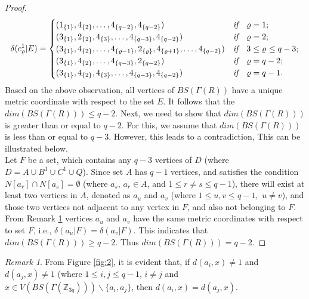 \documentclass[]{interact}
\theoremstyle{plain}%
\theoremstyle{definition}
\theoremstyle{remark}
\newtheorem{remark}{Remark}[section]
\begin{document}
\begin{proof}
                        \begin{equation*}
                        \delta({c^{1}_{\varrho}}|E)=
                   \begin{cases}
                   (1_{\{ 1 \}},4_{\{2\}},\ldots,4_{\{q-2\}},4_{\{q-2\}}) &\textit{if}\quad \varrho=1;\\
                   (3_{\{1\}},2_{\{2 \}},4_{\{3\}},\ldots,4_{\{q-3\}},4_{\{q-2\}}) &\textit{if}\quad \varrho=2 ;\\
                    (3_{\{1\}},4_{\{2\}},\ldots,4_{\{\varrho -1\}},2_{\{ \varrho \}},4_{\{\varrho +1\}},\ldots,4_{\{q-2\}}) & \textit{if}\quad 3 \leq  \varrho $ $\leq q-3  ;\\
                    (3_{\{1\}},4_{\{2\}},\ldots,4_{\{q-3\}},2_{\{q-2\}}) &\textit{if}\quad \varrho=q-2 ;\\
                    (3_{\{1\}},4_{\{2\}},4_{\{3\}},\ldots,4_{\{q-3\}},4_{\{q-2\}}) &\textit{if} \quad \varrho= q-1.\\
                    \end{cases}
			\end{equation*}
 \noindent Based on the  above observation, all vertices of $BS(\Gamma(R))$ have a unique metric coordinate with respect to the set $E$. It follows that the $dim(BS(\Gamma(R))) \leq q-2$. Next, we need to show that $dim(BS(\Gamma(R)))$ is greater than or equal to $q-2$. For this, we assume that $dim(BS(\Gamma(R)))$ is less than or equal to $q-3$. However, this leads to a contradiction, This can be illustrated below.\\
 
\noindent Let $F$ be a set, which contains any $q-3$ vertices of $D$ (where $D= A\cup B^1 \cup C^1  \cup Q $). Since set $A$ has $q-1$ vertices, and satisfies the condition $N[a_r]\cap  N[a_s]=\emptyset $ (where $a_s$, $a_r \in A$, and $1\leq r \neq s \leq q-1$), there will exist at least two vertices in $A$, denoted as $a_{u} $ and $a_{v} $ (where $1\leq u, v \leq q-1, $ $u \neq v$), and those two vertices not adjacent to any vertex in $F$, and also not belonging to $F$. From Remark \ref{11} vertices $a_u $ and $a_v $ have the same metric coordinates with respect to set $F$, i.e.,      
 $\delta(a_{u}|F) =\delta(a_{v}|F)$.
 This indicates that $dim(BS(\Gamma(R)))\geq q-2$. Thus $dim(BS(\Gamma(R)))= q-2.$ 

\end{proof}
\begin{remark}\label{11}
 From Figure \ref{fig:2}, it is evident that, if $d(a_i,x)\neq 1$ and  $d(a_j,x) \neq 1$ (where $1\leq i, j \leq q-1$, $i \neq j$ and $x\in V(BS(\Gamma(\mathbb{Z}_{3q})))\backslash\{a_i,a_j\}$, then $d(a_i,x)=d(a_j,x)$.   
  \end{remark}
\end{document}
